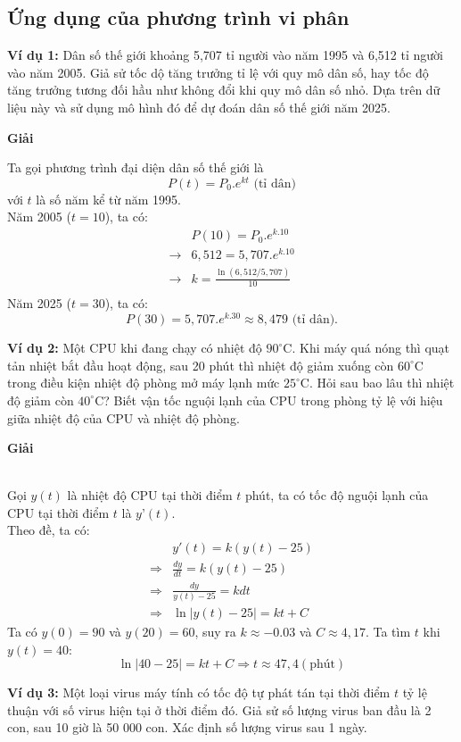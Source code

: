 \documentclass[13pt]{article}
\begin{document}
\subsection{Ứng dụng của phương trình vi phân}
\par\textbf{Ví dụ 1:} Dân số thế giới khoảng 5,707 tỉ người vào năm 1995 và 6,512 tỉ người vào năm 2005. Giả sử tốc dộ tăng trưởng tỉ lệ với quy mô dân số, hay tốc độ tăng trưởng tương đối hầu như không đổi khi quy mô dân số nhỏ. Dựa trên dữ liệu này và sử dụng mô hình đó để dự đoán dân số thế giới năm 2025.\\
\centerline{\textbf{Giải}}
Ta gọi phương trình đại diện dân số thế giới là $$P(t)=P_0.e^{kt}\text{ (tỉ dân)}$$với $t$ là số năm kể từ năm 1995.\\
Năm 2005 ($t=10$), ta có: \begin{align*}
    &P(10)=P_0.e^{k.10}\\
    \rightarrow &6,512=5,707.e^{k.10}\\
    \rightarrow &k=\frac{\ln(6,512/5,707)}{10}\\
\end{align*}
Năm 2025 ($t=30$), ta có: $$P(30)=5,707.e^{k.30}\approx8,479\text{ (tỉ dân).}$$
\par\textbf{Ví dụ 2:} Một CPU khi đang chạy có nhiệt độ $90^\circ$C. Khi máy quá nóng thì quạt tản nhiệt bắt đầu hoạt động, sau 20 phút thì nhiệt độ giảm xuống còn $60^\circ$C trong điều kiện nhiệt độ phòng mở máy lạnh mức $25^\circ$C. Hỏi sau bao lâu thì nhiệt độ giảm còn $40^\circ$C? Biết vận tốc nguội lạnh của CPU trong phòng tỷ lệ với hiệu giữa nhiệt độ của CPU và nhiệt độ phòng.\\
\centerline{\textbf{Giải}}\\
Gọi $y(t)$ là nhiệt độ CPU tại thời điểm $t$ phút, ta có tốc độ  nguội lạnh của CPU tại thời điểm $t$ là $y’(t)$.\\
Theo đề, ta có: \begin{align*}
&y'(t)=k(y(t)-25)\\
\Rightarrow &\frac{dy}{dt}=k(y(t)-25)\\
\Rightarrow &\frac{dy}{y(t)-25}=kdt\\
\Rightarrow &\ln|y(t)-25|=kt+C
\end{align*}
Ta có $y(0)=90$ và $y(20)=60$, suy ra $k\approx-0.03$ và $C\approx4,17$. Ta tìm $t$ khi $y(t)=40$: $$\ln|40-25|=kt+C\Rightarrow t\approx47,4(\text{phút})$$
\par\textbf{Ví dụ 3:} Một loại virus máy tính có tốc độ tự phát tán tại thời điểm $t$ tỷ lệ thuận với số virus hiện tại ở thời điểm đó. Giả sử số lượng virus ban đầu là 2 con, sau 10 giờ là 50 000 con. Xác định số lượng virus sau 1 ngày.\\
\end{document}
